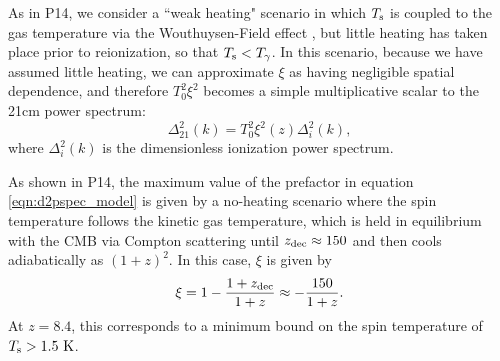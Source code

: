\documentclass[twocolumn,numberedappendix]{emulateapj} \shorttitle{PSA64}
\newcommand{\Tspin}{T_{\rm s}}
\newcommand{\Tcmb}{T_\gamma}
\begin{document}
As in P14,
we consider a ``weak heating" scenario in which $\Tspin$ is coupled to the gas temperature via
the Wouthuysen-Field effect \citep{wouthuysen1952,field1958,hirata2006},
but little heating has taken place prior to reionization, so that $\Tspin<\Tcmb$.
In this scenario, 
because we have assumed little heating, we can approximate $\xi$ as having negligible spatial
dependence, and therefore $T_0^2\xi^2$ becomes a simple multiplicative scalar to the 
21cm power spectrum:
\begin{equation}\label{eqn:d2pspec_model}
    \Delta^2_{21}(k) = T_0^2\xi^2(z)\Delta_{i}^{2}(k),%
\end{equation}
where $\Delta_{i}^{2}(k)$ is the dimensionless ionization power spectrum. 

As shown in P14, the maximum value of the
prefactor in equation \ref{eqn:d2pspec_model} is given by 
a no-heating scenario where the spin temperature follows the kinetic gas temperature,
which is held in equilibrium with the CMB via Compton scattering until $z_{\rm dec}\approx150$
\citep{furlanetto_et_al2006} and then cools adiabatically
as $(1+z)^2$.
In this case, $\xi$ is given by
\begin{equation}\label{eqn:maxxi}
\xi = 1 -\frac{1+z_{\rm dec}}{1+z} \approx -\frac{150}{1+z}.
\end{equation}
At $z=8.4$, this corresponds to a minimum bound on the spin temperature of $\Tspin>1.5~{\rm K}$.
\end{document}
